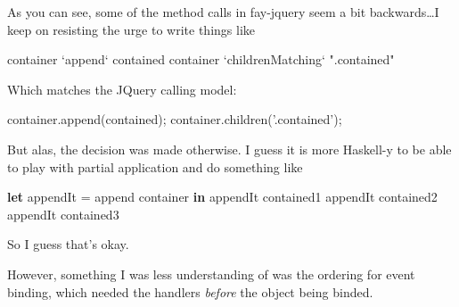 \documentclass[]{article}
\newenvironment{Shaded}{}{}
\newcommand{\KeywordTok}[1]{\textcolor[rgb]{0.00,0.44,0.13}{\textbf{{#1}}}}
\newcommand{\DataTypeTok}[1]{\textcolor[rgb]{0.56,0.13,0.00}{{#1}}}
\newcommand{\StringTok}[1]{\textcolor[rgb]{0.25,0.44,0.63}{{#1}}}
\newcommand{\CommentTok}[1]{\textcolor[rgb]{0.38,0.63,0.69}{\textit{{#1}}}}
\newcommand{\OtherTok}[1]{\textcolor[rgb]{0.00,0.44,0.13}{{#1}}}
\newcommand{\FunctionTok}[1]{\textcolor[rgb]{0.02,0.16,0.49}{{#1}}}
\newcommand{\VariableTok}[1]{\textcolor[rgb]{0.10,0.09,0.49}{{#1}}}
\newcommand{\OperatorTok}[1]{\textcolor[rgb]{0.40,0.40,0.40}{{#1}}}
\newcommand{\AttributeTok}[1]{\textcolor[rgb]{0.49,0.56,0.16}{{#1}}}
\newcommand{\NormalTok}[1]{{#1}}
\begin{document}
As you can see, some of the method calls in fay-jquery seem a bit backwards\ldots{}I keep on
resisting the urge to write things like

\begin{Shaded}
\begin{Highlighting}[]
\NormalTok{container }\OtherTok{`append`} \NormalTok{contained}
\NormalTok{container }\OtherTok{`childrenMatching`} \StringTok{".contained"}
\end{Highlighting}
\end{Shaded}

Which matches the JQuery calling model:

\begin{Shaded}
\begin{Highlighting}[]
\VariableTok{container}\NormalTok{.}\AttributeTok{append}\NormalTok{(contained)}\OperatorTok{;}
\VariableTok{container}\NormalTok{.}\AttributeTok{children}\NormalTok{(}\StringTok{'.contained'}\NormalTok{)}\OperatorTok{;}
\end{Highlighting}
\end{Shaded}

But alas, the decision was made otherwise. I guess it is more Haskell-y to be able to play with
partial application and do something like

\begin{Shaded}
\begin{Highlighting}[]
\KeywordTok{let}
  \NormalTok{appendIt }\FunctionTok{=} \NormalTok{append container}
\KeywordTok{in}
  \NormalTok{appendIt contained1}
  \NormalTok{appendIt contained2}
  \NormalTok{appendIt contained3}
\end{Highlighting}
\end{Shaded}

So I guess that's okay.

However, something I was less understanding of was the ordering for event binding, which needed the
handlers \emph{before} the object being binded.

\begin{Shaded}
\end{Shaded}
\end{document}
